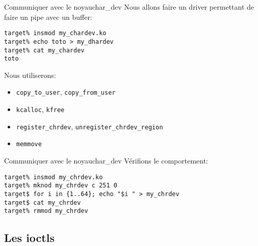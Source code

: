 \begin{frame}[fragile=singleslide]{Communiquer avec le noyau}{char\_dev}
  Nous allons faire un driver permettant de faire un pipe avec un buffer:
  \begin{lstlisting}
target% insmod my_chardev.ko
target% echo toto > my_dhardev
target% cat my_chardev
toto
  \end{lstlisting}
  Nous utiliserons:
  \begin{itemize}
  \item \verb+copy_to_user+, \verb+copy_from_user+
  \item \verb+kcalloc+, \verb+kfree+
  \item \verb+register_chrdev+, \verb+unregister_chrdev_region+
  \item \verb+memmove+
  \end{itemize}
\end{frame}

\begin{frame}[fragile=singleslide]{Communiquer avec le noyau}{char\_dev}
   Vérifions le comportement:
   \begin{lstlisting}
target% insmod my_chrdev.ko
target% mknod my_chrdev c 251 0
target$ for i in {1..64}; echo "$i " > my_chrdev
target$ cat my_chrdev
target% rmmod my_chrdev
    \end{lstlisting} %
\end{frame}

\subsection{Les ioctls}

